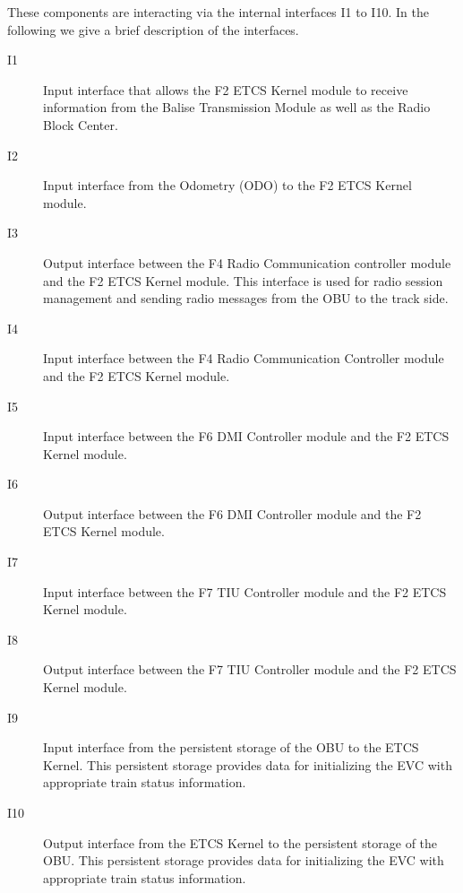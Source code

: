 These components are interacting via the internal interfaces I1 to I10. In the following we give a brief description of the interfaces.
\begin{description}
\item[I1] Input interface that allows the F2 ETCS Kernel module to receive information from the Balise Transmission Module as well as the Radio Block Center.

\item[I2] Input interface from the Odometry (ODO) to the F2 ETCS Kernel module.

\item[I3] Output interface between the F4 Radio Communication controller module and the F2 ETCS Kernel module. This interface is used for radio session management and sending radio messages from the OBU to the track side.

\item[I4] Input interface between the F4 Radio Communication Controller module and the F2 ETCS Kernel module.

\item[I5] Input interface between the F6 DMI Controller module and the F2 ETCS Kernel module.

\item[I6] Output interface between the F6 DMI Controller module and the F2 ETCS Kernel module.

\item[I7] Input interface between the F7 TIU Controller module and the F2 ETCS Kernel module.

\item[I8] Output interface between the F7 TIU Controller module and the F2 ETCS Kernel module.
\item[I9] Input interface from the persistent storage of the OBU to the ETCS Kernel. This persistent storage provides data for initializing the EVC with appropriate train status information.
\item[I10]  Output interface from the ETCS Kernel to the persistent storage of the OBU. This persistent storage provides data for initializing the EVC with appropriate train status information.

\end{description}






